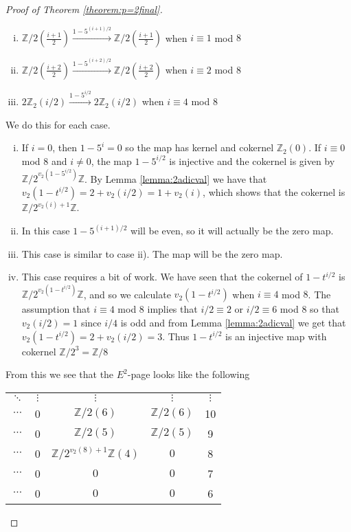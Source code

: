 \documentclass[a4paper]{article} %
\theoremstyle{definition}
\newcommand{\toWithMapLong}[1]{\overset{#1}{\longrightarrow}}
\newcommand{\Z}{\mathbb{Z}}
\begin{document}
\begin{proof}[Proof of Theorem \ref{theorem:p=2final}]
\begin{enumerate}[i)]
    \item $\Z/2(\frac{i+1}{2}) \toWithMapLong{1-5^{(i+1)/2}} \Z/2(\frac{i+1}{2})$ when $i \equiv 1$ mod $8$
    \item $\Z/2(\frac{i+2}{2}) \toWithMapLong{1-5^{(i+2)/2}} \Z/2(\frac{i+2}{2})$ when $i \equiv 2$ mod $8$
    \item $2\Z_2(i/2) \toWithMapLong{1-5^{i/2}} 2\Z_2(i/2)$ when $i \equiv 4$ mod $8$
  \end{enumerate}
  We do this for each case.
  \begin{enumerate}[i)]
    \item If $i=0$, then $1-5^i = 0$ so the map has kernel and cokernel $\Z_2(0)$. If $i \equiv 0$ mod $8$ and $i \neq 0$, the map $1-5^{i/2}$ is injective and the cokernel is given by $\Z/2^{v_2(1-5^{i/2})}\Z$. By Lemma \ref{lemma:2adicval} we have that $v_2(1-t^{i/2}) = 2 + v_2(i/2) = 1 + v_2(i)$,
    which shows that the cokernel is $\Z/2^{v_2(i)+1}\Z$.
    \item In this case $1-5^{(i+1)/2}$ will be even, so it will actually be the zero map.
    \item This case is similar to case ii). The map will be the zero map.
    \item This case requires a bit of work. We have seen that the cokernel of $1-t^{i/2}$ is $\Z/2^{v_2(1-t^{i/2})}\Z$, and so we calculate $v_2({1-t^{i/2}})$ when $i \equiv 4$ mod $8$. The assumption that $i \equiv 4$ mod $8$ implies that $i/2 \equiv 2$ or $i/2 \equiv 6$ mod $8$ so that $v_2(i/2) = 1$ since $i/4$ is odd
    and from Lemma \ref{lemma:2adicval} we get that $v_2(1-t^{i/2}) = 2 + v_2(i/2) = 3$. Thus $1-t^{i/2}$ is an injective map with cokernel $\Z/2^3 = \Z/8$
  \end{enumerate}
  From this we see that the $E^2$-page looks like the following
  \begin{table}[H]
    \centering
    \setlength{\tabcolsep}{12pt}
    \setlength{\extrarowheight}{2pt}
  \begin{tabular}{cccc|c}
    $\ddots$        &   $\vdots$ &  $\vdots$  & $\vdots$  & $\vdots$ \\
    $\cdots$        &   0 &  $\Z/2(6)$  & $\Z/2(6)$  & 10 \\
    $\cdots$        &   0 &  $\Z/2(5)$  & $\Z/2(5)$  & 9 \\
    $\cdots$        &   0 &  $\Z/2^{v_2(8)+1}\Z(4)$  & $0$  & 8 \\
    $\cdots$        &   0 &  $0$  & $0$  & 7 \\
    $\cdots$        &   0 &  $0$  & $0$  & 6 \\

\end{tabular}
\end{table}
\end{proof}
\end{document}
